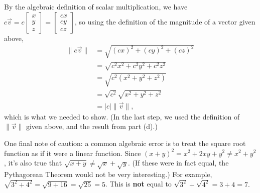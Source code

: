 \documentclass[12pt]{article}
\newcommand{\abs}[1]{\lvert #1\rvert}
\newcommand{\len}[1]{\lVert #1\rVert}
\newcommand{\bbm}{\begin{bmatrix}}
\newcommand{\ebm}{\end{bmatrix}}
\begin{document}
\begin{enumerate}
\begin{enumerate}
By the algebraic definition of scalar multiplication, we have $c\vec{v} = c\bbm x\\y\\z\ebm = \bbm cx\\cy\\cz\ebm$, so using the definition of the magnitude of a vector given above,
\begin{align*}
 \len{c\vec{v}} & = \sqrt{(cx)^2+(cy)^2+(cz)^2}\\
& = \sqrt{c^2x^2+c^2y^2+c^2z^2}\\
& = \sqrt{c^2(x^2+y^2+z^2)}\\
& = \sqrt{c^2}\sqrt{x^2+y^2+z^2}\\
& = \abs{c}\len{\vec{v}},
\end{align*}
which is what we needed to show. (In the last step, we used the definition of $\len{\vec{v}}$ given above, and the result from part (d).)

\medskip

One final note of caution: a common algebraic error is to treat the square root function as if it were a linear function. Since $(x+y)^2 = x^2+2xy+y^2 \neq x^2+y^2$, it's also true that $\sqrt{x+y}\neq \sqrt{x}+\sqrt{y}$. (If these were in fact equal, the Pythagorean Theorem would not be very interesting.) For example, $\sqrt{3^2+4^2} = \sqrt{9+16} = \sqrt{25}=5$. This is {\bf not} equal to $\sqrt{3^2}+\sqrt{4^2} = 3+4=7.$
\end{enumerate}

 \end{enumerate}
\end{document}
